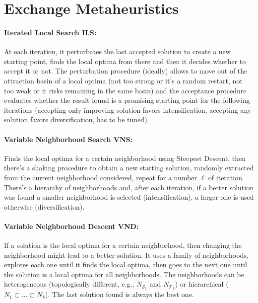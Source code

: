 \documentclass{article}
\begin{document}
	\section*{Exchange Metaheuristics}
	
	\paragraph{Iterated Local Search ILS:} At each iteration, it perturbates the last accepted solution to create a new starting point, finds the local optima from there and then it decides whether to accept it or not. The perturbation procedure (ideally) allows to move out of the attraction basin of a local optima (not too strong or it's a random restart, not too weak or it risks remaining in the same basin) and the acceptance procedure evaluates whether the result found is a promising starting point for the following iterations (accepting only improving solution favors intensification, accepting any solution favors diversification, has to be tuned). \\
	
	\paragraph{Variable Neighborhood Search VNS:} Finds the local optima for a certain neighborhood using Steepest Descent, then there's a shaking procedure to obtain a new starting solution, randomly extracted from the current neighborhood considered, repeat for a number $\ell$ of iteration. There's a hierarchy of neighborhoods and, after each iteration, if a better solution was found a smaller neighborhood is selected (intensification), a larger one is used otherwise (diversification).\\
	
	\paragraph{Variable Neighborhood Descent VND:} If a solution is the local optima for a certain neighborhood, then changing the neighborhood might lead to a better solution. It uses a family of neighborhoods, explores each one until it finds the local optima, then goes to the next one until the solution is a local optima for all neighborhoods. The neighborhoods can be heterogeneous (topologically different, e.g., $N_{\mathcal{S}_1}$ and $N_{\mathcal{T}_1}$) or hierarchical ($N_1 \subset \dots \subset N_k$). The last solution found is always the best one.\\
	
\end{document}
